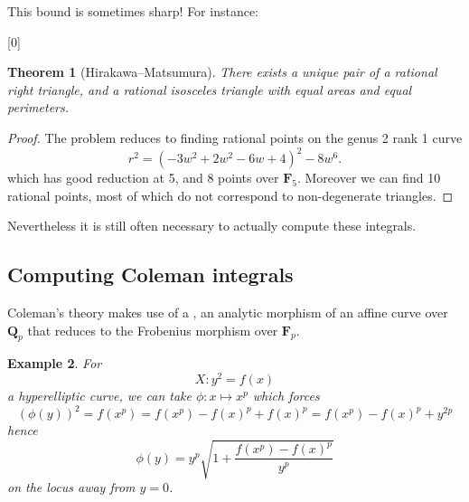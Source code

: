 \documentclass[oneside,11pt,]{article}
\newtheorem{theorem}{Theorem}
\newtheorem{example}[theorem]{Example}
\newcommand{\FF}{\mathbf{F}}
\let\emph\relax %
\begin{document}
This bound is sometimes sharp! For instance:

[0]
\begin{minipage}{0.60\linewidth}\begin{theorem}[Hirakawa--Matsumura]
There exists a unique pair of a rational right triangle, and a rational isosceles triangle with equal areas and equal perimeters.
\end{theorem}
\begin{proof}
    The problem reduces to finding rational points on the genus 2 rank 1 curve
    \[r^2 = (-3w^2 + 2w^2 - 6w +4)^2 - 8w^6.\]
    which has good reduction at 5, and 8 points over \(\FF_5\).
    Moreover we can find 10 rational points, most of which do not correspond to non-degenerate triangles.
\end{proof}\end{minipage}

Nevertheless it is still often necessary to actually compute these integrals.

\subsection{Computing Coleman integrals}
Coleman's theory makes use of a \emph{lift of Frobenius}, an analytic morphism of an affine curve over $\mathbf Q_p$ that reduces to the Frobenius morphism over $\mathbf F_p$.
\begin{example}
    For \[X \colon  y^2 = f(x)\] a hyperelliptic curve, we can take
    \(\phi \colon x \mapsto x^p\)
    which forces
    \[ (\phi (y))^2 = f (x^p) = f(x^p) - f(x)^p + f(x)^p = f(x^p) - f(x)^p + y^{2p}\]
    hence
    \[ \phi (y) = y^p\sqrt{1 + \frac{f(x^p) - f(x)^p}{y^p}}\]
    on the locus away from $y = 0$.
\end{example}
\end{document}
